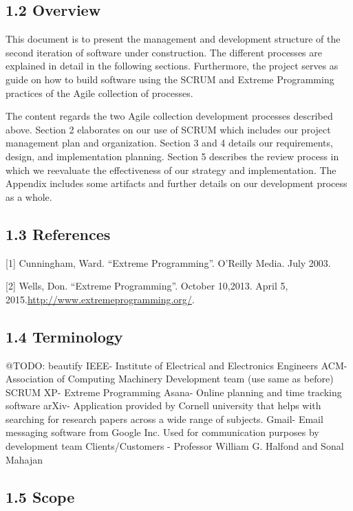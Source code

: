 \documentclass[]{article}
\begin{document}
\subsection{1.2 Overview}\label{overview}

This document is to present the management and development structure of
the second iteration of software under construction. The different
processes are explained in detail in the following sections.
Furthermore, the project serves as guide on how to build software using
the SCRUM and Extreme Programming practices of the Agile collection of
processes.

The content regards the two Agile collection development processes
described above. Section 2 elaborates on our use of SCRUM which includes
our project management plan and organization. Section 3 and 4 details
our requirements, design, and implementation planning. Section 5
describes the review process in which we reevaluate the effectiveness of
our strategy and implementation. The Appendix includes some artifacts
and further details on our development process as a whole.

\subsection{1.3 References}\label{references}

{[}1{]} Cunningham, Ward. ``Extreme Programming''. O'Reilly Media. July
2003.

{[}2{]} Wells, Don. ``Extreme Programming''. October 10,2013. April 5,
2015.\url{http://www.extremeprogramming.org/}.

\subsection{1.4 Terminology}\label{terminology}

@TODO: beautify IEEE- Institute of Electrical and Electronics Engineers
ACM- Association of Computing Machinery Development team (use same as
before) SCRUM XP- Extreme Programming Asana- Online planning and time
tracking software arXiv- Application provided by Cornell university that
helps with searching for research papers across a wide range of
subjects. Gmail- Email messaging software from Google Inc. Used for
communication purposes by development team Clients/Customers - Professor
William G. Halfond and Sonal Mahajan

\subsection{1.5 Scope}\label{scope}
\end{document}

